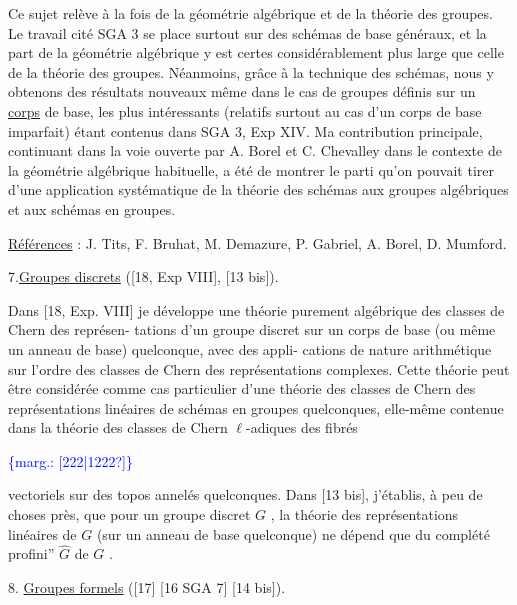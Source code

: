 \documentclass[11pt]{article}
\newcommand{\scanpage}[1]{\par\bigskip\noindent{\small\sffamily[scan #1]}\par}
\newcommand{\mspage}[1]{{\small\sffamily[p.\,#1]}}
\newcommand{\margin}[1]{\textcolor{blue}{\{\textsf{marg.:} #1\}}}
\newcommand{\uline}[1]{\underline{#1}}
\newcommand{\unsure}[1]{[#1?]}
\begin{document}
Ce sujet relève à la fois de la géométrie
algébrique et de la théorie des groupes. Le travail
cité SGA 3 se place surtout sur des schémas de base
généraux, et la part de la géométrie algébrique y est
certes considérablement plus large que celle de la
théorie des groupes. Néanmoins, grâce à la technique
des schémas, nous y obtenons des résultats nouveaux
même dans le cas de groupes définis sur un \uline{corps} de
base, les plus intéressants (relatifs surtout au cas
d'un corps de base imparfait) étant contenus dans
SGA 3, Exp XIV. Ma contribution principale, continuant
dans la voie ouverte par A. Borel et C. Chevalley dans
le contexte de la géométrie algébrique habituelle, a
été de montrer le parti qu'on pouvait tirer d'une
application systématique de la théorie des schémas aux
groupes algébriques et aux schémas en groupes.

\uline{Références} : J. Tits, F. Bruhat, M. Demazure, P. Gabriel,
A. Borel, D. Mumford.


7.\quad \uline{Groupes discrets} ([18, Exp VIII], [13 bis]).

Dans [18, Exp. VIII] je développe une théorie
purement algébrique des classes de Chern des représen-%
tations d'un groupe discret sur un corps de base
(ou même un anneau de base) quelconque, avec des appli-%
cations de nature arithmétique sur l'ordre des classes
de Chern des représentations complexes. Cette théorie
peut être considérée comme cas particulier d'une théorie
des classes de Chern des représentations linéaires
de schémas en groupes quelconques, elle-même contenue
dans la théorie des classes de Chern $\ell$-adiques des fibrés

\margin{\unsure{222|1222}}

\clearpage
\scanpage{119/223}
\mspage{. 10 .}

vectoriels sur des topos annelés quelconques. Dans
[13 bis], j'établis, à peu de choses près, que pour un
groupe discret $G$ , la théorie des représentations
linéaires de $G$ (sur un anneau de base quelconque)
ne dépend que du complété profini'' $\hat{G}$ de $G$ .

8. \uline{Groupes formels} ([17] [16 SGA 7] [14 bis]).
\end{document}
